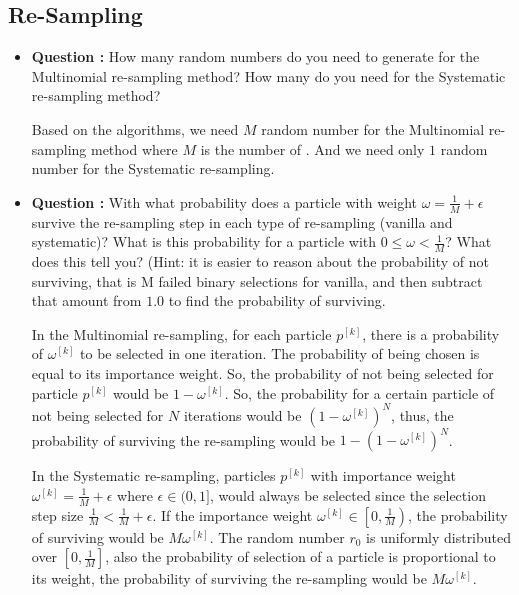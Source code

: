 \documentclass[11pt,a4paper]{article}
\begin{document}
\subsection{Re-Sampling}
\begin{itemize}
	\item\addtocounter{Counter}{1}\textbf{Question :} How many random numbers do you need to generate for the Multinomial re-sampling method? How many do you need for the Systematic re-sampling method?
		\par Based on the algorithms, we need $M$ random number for the Multinomial re-sampling method where $M$ is the number of . And we need only $1$ random number for the Systematic re-sampling.

	\item\addtocounter{Counter}{1}\textbf{Question :} With what probability does a particle with weight $\omega = \frac{1}{M} + \epsilon$  survive the re-sampling step in each type of re-sampling (vanilla and systematic)? What is this probability for a particle with $0 \leq \omega < \frac{1}{M}$? What does this tell you? (Hint: it is easier to reason about the probability of not surviving, that is M failed binary selections for vanilla, and then subtract that amount from $1.0$ to find the probability of surviving.
		\par In the Multinomial re-sampling, for each particle $p^{[k]}$, there is a probability of $\omega^{[k]}$ to be selected in one iteration. The probability of being chosen is equal to its importance weight. So, the probability of not being selected for particle $p^{[k]}$ would be $1 - \omega^{[k]}$. So, the probability for a certain particle of not being selected for $N$ iterations would be $(1 - \omega^{[k]})^{N}$, thus, the probability of surviving the re-sampling would be $1 - (1 - \omega^{[k]})^{N}$.
		\par In the Systematic re-sampling, particles $p^{[k]}$ with importance weight $\omega^{[k]} = \frac{1}{M} + \epsilon$ where $\epsilon \in (0, 1]$, would always be selected since the selection step size $\frac{1}{M} < \frac{1}{M} + \epsilon$. If the importance weight $\omega^{[k]} \in \left[ 0, \frac{1}{M} \right)$, the probability of surviving would be $M \omega^{[k]}$. The random number $r_{0}$ is uniformly distributed over $\left[ 0, \frac{1}{M} \right]$, also the probability of selection of a particle is proportional to its weight, the probability of surviving the re-sampling would be $M \omega^{[k]}$.
\end{itemize}
\end{document}
